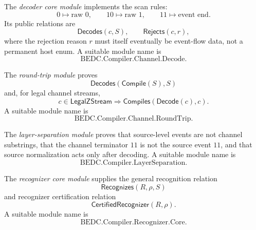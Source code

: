 \begin{definition}
\label{def:implementation-interface-decoder-core}
The \emph{decoder core module} implements the scan rules:
$$
  0\mapsto \text{raw }0,\qquad
  10\mapsto \text{raw }1,\qquad
  11\mapsto \text{event end}.
$$
Its public relations are
$$
  \mathsf{Decodes}(c,S),
  \qquad
  \mathsf{Rejects}(c,r),
$$
where the rejection reason $r$ must itself eventually be event-flow data, not a permanent host enum. A suitable module name is
$$
  \mathrm{BEDC.Compiler.Channel.Decode}.
$$
\end{definition}

\begin{definition}
\label{def:implementation-interface-roundtrip-module}
The \emph{round-trip module} proves
$$
  \mathsf{Decodes}(\mathsf{Compile}(S),S)
$$
and, for legal channel streams,
$$
  c\in\mathsf{LegalZStream}
  \Rightarrow
  \mathsf{Compiles}(\mathsf{Decode}(c),c).
$$
A suitable module name is
$$
  \mathrm{BEDC.Compiler.Channel.RoundTrip}.
$$
\end{definition}

\begin{definition}
\label{def:implementation-interface-layer-separation-module}
The \emph{layer-separation module} proves that source-level events are not channel substrings, that the channel terminator $11$ is not the source event $11$, and that source normalization acts only after decoding. A suitable module name is
$$
  \mathrm{BEDC.Compiler.LayerSeparation}.
$$
\end{definition}

\begin{definition}
\label{def:implementation-interface-recognizer-core-module}
The \emph{recognizer core module} supplies the general recognition relation
$$
  \mathsf{Recognizes}(R,\rho,S)
$$
and recognizer certification relation
$$
  \mathsf{CertifiedRecognizer}(R,\rho).
$$
A suitable module name is
$$
  \mathrm{BEDC.Compiler.Recognizer.Core}.
$$
\end{definition}

